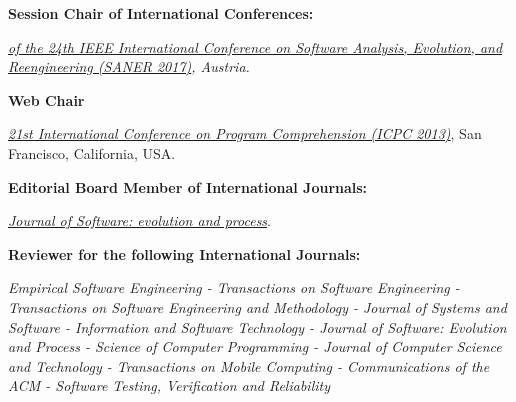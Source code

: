 \documentclass[12pt]{article}
\begin{document}
\textbf{Session Chair of International Conferences:}
\begin{innerlist}

       \item \emph{\href{http://saner.aau.at/}
                   {\textit{of the 24th IEEE International Conference on Software Analysis, Evolution, and Reengineering (SANER 2017)}}, Austria.}

\end{innerlist}

\textbf{Web Chair}
\begin{innerlist}
   \item \emph{
              \href{http://icpc2014.usask.ca/‎}
                   {21st International Conference on Program Comprehension (ICPC 2013)}}, San Francisco, California, USA.\\
\end{innerlist}

\textbf{Editorial Board Member of International Journals:}
\begin{innerlist}
   \item \emph{
              \href{http://onlinelibrary.wiley.com/journal/10.1002/(ISSN)2047-7481��}
                   {Journal of Software: evolution and process}}.
\end{innerlist}


\textbf{Reviewer for the following International Journals:}
\begin{innerlist}
\item \emph{Empirical Software Engineering - Transactions on Software Engineering - Transactions on Software Engineering and Methodology - Journal of Systems and Software - Information and Software Technology - Journal of Software: Evolution and Process - Science of Computer Programming - Journal of Computer Science and Technology - Transactions on Mobile Computing - Communications of the ACM - Software Testing, Verification and Reliability}\\
\end{innerlist} 

\end{document}
